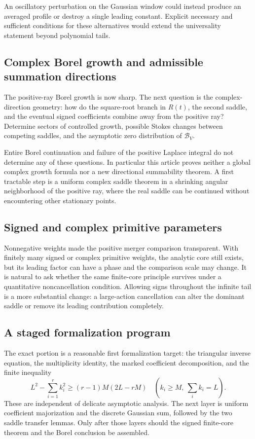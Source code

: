 \documentclass[11pt,a4paper]{article}
\numberwithin{equation}{section}
\theoremstyle{definition}
\theoremstyle{remark}
\newcommand{\Bcal}{\mathcal B}\newcommand{\Ccal}{\mathcal C}
\begin{document}
An oscillatory perturbation on the Gaussian window could instead produce
an averaged profile or destroy a single leading constant. Explicit
necessary and sufficient conditions for these alternatives would extend
the universality statement beyond polynomial tails.

\subsection{Complex Borel growth and admissible summation directions}

The positive-ray Borel growth is now sharp. The next question is the
complex-direction geometry: how do the square-root branch in $R(t)$, the
second saddle, and the eventual signed coefficients combine away from the
positive ray? Determine sectors of controlled growth, possible Stokes
changes between competing saddles, and the asymptotic zero distribution
of $\Bcal_V$.

Entire Borel continuation and failure of the positive Laplace integral
do not determine any of these questions. In particular this article proves
neither a global complex growth formula nor a new directional summability
theorem. A first tractable step is a uniform complex saddle theorem in a
shrinking angular neighborhood of the positive ray, where the real saddle
can be continued without encountering other stationary points.

\subsection{Signed and complex primitive parameters}

Nonnegative weights made the positive merger comparison transparent.
With finitely many signed or complex primitive weights, the analytic core
still exists, but its leading factor can have a phase and the comparison
scale may change. It is natural to ask whether the same finite-core
principle survives under a quantitative noncancellation condition.
Allowing signs throughout the infinite tail is a more substantial change:
a large-action cancellation can alter the dominant saddle or remove its
leading contribution completely.

\subsection{A staged formalization program}

The exact portion is a reasonable first formalization target: the
triangular inverse equation, the multiplicity identity, the marked
coefficient decomposition, and the finite inequality
\[
 L^2-\sum_{i=1}^r k_i^2
 \ge(r-1)M(2L-rM)
 \quad(k_i\ge M,\ \sum_i k_i=L).
\]
These are independent of delicate asymptotic analysis. The next layer is
uniform coefficient majorization and the discrete Gaussian sum, followed
by the two saddle transfer lemmas. Only after those layers should the
signed finite-core theorem and the Borel conclusion be assembled.
\end{document}
